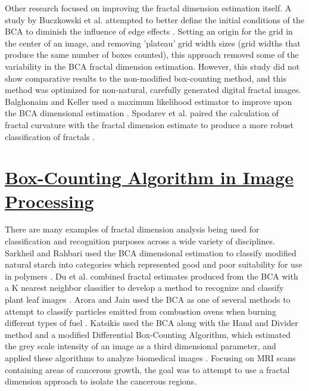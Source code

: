 \documentclass[12pt, oneside]{book}
\begin{document}
Other research focused on improving the fractal dimension estimation itself.  A study by Buczkowski et al. attempted to better define the initial conditions of the BCA to diminish the influence of edge effects \cite{buczkowski_modified_1998}.  Setting an origin for the grid in the center of an image, and removing 'plateau' grid width sizes (grid widths that produce the same number of boxes counted), this approach removed some of the variability in the BCA fractal dimension estimation.  However, this study did not show comparative results to the non-modified box-counting method, and this method was optimized for non-natural, carefully generated digital fractal images.  Balghonaim and Keller used a maximum likelihood estimator to improve upon the BCA dimensional estimation \cite{balghonaim_maximum_1998}.  Spodarev et al. paired the calculation of fractal curvature with the fractal dimension estimate to produce a more robust classification of fractals \cite{spodarev_estimation_2015}.

\section{\underline{Box-Counting Algorithm in Image Processing}}
There are many examples of fractal dimension analysis being used for classification and recognition purposes across a wide variety of disciplines.  Sarkheil and Rahbari used the BCA dimensional estimation to classify modified natural starch into categories which represented good and poor suitability for use in polymers \cite{sarkheil_fractal_????}.  Du et al. combined fractal estimates produced from the BCA with a K nearest neighbor classifier to develop a method to recognize and classify plant leaf images  \cite{du_recognition_2013}.  Arora and Jain used the BCA as one of several methods to attempt to classify particles emitted from combustion ovens when burning different types of fuel \cite{arora_morphological_2015}.  Katsikis used the BCA along with the Hand and Divider method and a modified Differential Box-Counting Algorithm, which estimated the grey scale intensity of an image as a third dimensional parameter, and applied these algorithms to analyze biomedical images \cite{katsikis_fractal_2012}. Focusing on MRI scans containing areas of cancerous growth, the goal was to attempt to use a fractal dimension approach to isolate the cancerous regions.
\end{document}
